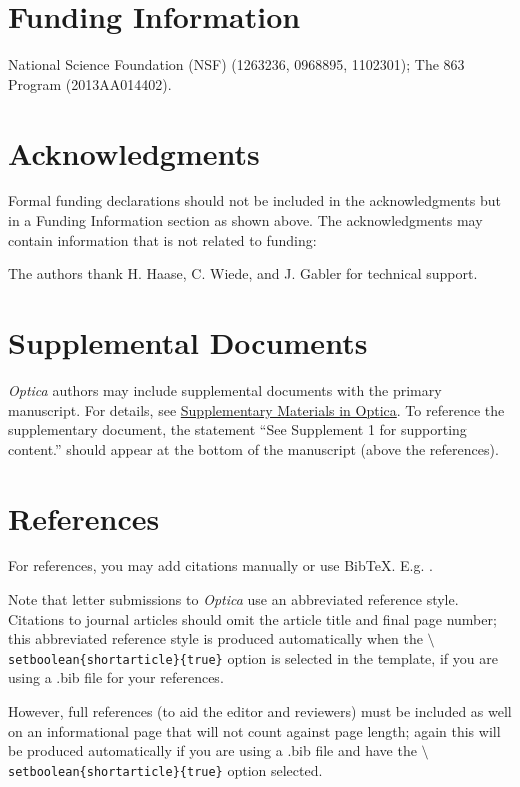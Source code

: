 \documentclass[9pt,twocolumn,twoside]{optica}
\begin{document}
\section*{Funding Information}
National Science Foundation (NSF) (1263236, 0968895, 1102301); The 863 Program (2013AA014402).

\section*{Acknowledgments}

Formal funding declarations should not be included in the acknowledgments but in a Funding Information section as shown above. The acknowledgments may contain information that is not related to funding:

The authors thank H. Haase, C. Wiede, and J. Gabler for technical support.

\section*{Supplemental Documents}
\emph{Optica} authors may include supplemental documents with the primary manuscript. For details, see \href{http://www.opticsinfobase.org/submit/style/supplementary-materials-optica.cfm}{Supplementary Materials in Optica}. To reference the supplementary document, the statement ``See Supplement 1 for supporting content.'' should appear at the bottom of the manuscript (above the references).


\section*{References}

For references, you may add citations manually or use BibTeX. E.g. \cite{Zhang:14}.

Note that letter submissions to \emph{Optica} use an abbreviated reference style. Citations to journal articles should omit the article title and final page number; this abbreviated reference style is produced automatically when the \texttt{$\setminus$setboolean\{shortarticle\}\{true\}} option is selected in the template, if you are using a .bib file for your references. 

However, full references (to aid the editor and reviewers) must be included as well on an informational page that will not count against page length; again this will be produced automatically if you are using a .bib file and have the \texttt{$\setminus$setboolean\{shortarticle\}\{true\}} option selected.
\end{document}
